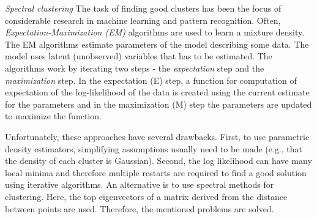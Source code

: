 \textit{Spectral clustering} \cite{ng2002spectral}
The task of finding good clusters has been the focus of considerable research in machine learning and pattern recognition.
Often, \textit{Expectation-Maximization (EM)} algorithms are used to learn a mixture density.
The EM algorithms estimate parameters of the model describing some data.
The model uses latent (unobserved) variables that has to be estimated.
The algorithms work by iterating two steps - the \textit{expectation} step and the \textit{maximization} step.
In the expectation (E) step, a function for computation of expectation of the log-likelihood of the data is created using the current estimate for the parameters and in the maximization (M) step the parameters are updated to maximize the function.
\par
Unfortunately, these approaches have several drawbacks.
First, to use parametric density estimators, simplifying assumptions usually need to be made (e.g., that the density of each cluster is Gaussian).
Second, the log likelihood can have many local minima and therefore multiple restarts are required to find a good solution using iterative algorithms. 
An alternative is to use spectral methods for clustering.
Here, the top eigenvectors of a matrix derived from the distance between points are used.
Therefore, the mentioned problems are solved.
\pagebreak
